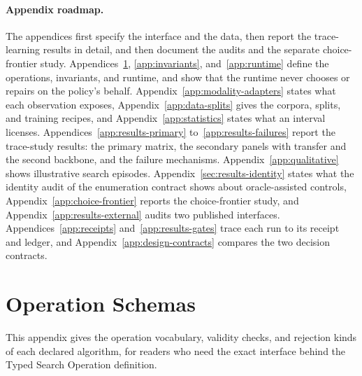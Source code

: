 

\paragraph{Appendix roadmap.} The appendices first specify the interface and the data, then report the trace-learning results in detail, and then document the audits and the separate choice-frontier study. Appendices~\ref{appendix}, \ref{app:invariants}, and~\ref{app:runtime} define the operations, invariants, and runtime, and show that the runtime never chooses or repairs on the policy's behalf. Appendix~\ref{app:modality-adapters} states what each observation exposes, Appendix~\ref{app:data-splits} gives the corpora, splits, and training recipes, and Appendix~\ref{app:statistics} states what an interval licenses. Appendices~\ref{app:results-primary} to~\ref{app:results-failures} report the trace-study results: the primary matrix, the secondary panels with transfer and the second backbone, and the failure mechanisms. Appendix~\ref{app:qualitative} shows illustrative search episodes. Appendix~\ref{sec:results-identity} states what the identity audit of the enumeration contract shows about oracle-assisted controls, Appendix~\ref{app:choice-frontier} reports the choice-frontier study, and Appendix~\ref{app:results-external} audits two published interfaces. Appendices~\ref{app:receipts} and~\ref{app:results-gates} trace each run to its receipt and ledger, and Appendix~\ref{app:design-contracts} compares the two decision contracts.

\section{Operation Schemas}
\label{appendix}

This appendix gives the operation vocabulary, validity checks, and rejection kinds of each declared algorithm, for readers who need the exact interface behind the Typed Search Operation definition.

